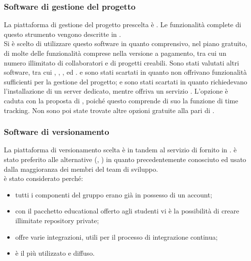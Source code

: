 \subsubsection{Software di gestione del progetto}
La piattaforma di gestione del progetto prescelta è \textbf{}. Le funzionalità complete di questo strumento vengono descritte in .\\
Si è scelto di utilizzare questo software in quanto comprensivo, nel piano gratuito, di molte delle funzionalità comprese nella versione a pagamento, tra cui un numero illimitato di collaboratori e di progetti creabili. Sono stati valutati altri software, tra cui , , ,  ed .  e  sono stati scartati in quanto non offrivano funzionalità sufficienti per la gestione del progetto;  e  sono stati scartati in quanto richiedevano l'installazione di un server dedicato, mentre  offriva un servizio . L'opzione  è caduta con la proposta di , poiché questo comprende di suo la funzione di time tracking. Non sono poi state trovate altre opzioni gratuite alla pari di .

\subsubsection{Software di versionamento}
La piattaforma di versionamento scelta è  in tandem al servizio di  fornito in .  è stato preferito alle alternative (, ) in quanto precedentemente conosciuto ed usato dalla maggioranza dei membri del team di sviluppo.\\
 è stato considerato perché:
\begin{itemize}
	\item tutti i componenti del gruppo erano già in possesso di un account;
	\item con il pacchetto educational offerto agli studenti vi è la possibilità di creare illimitate repository private;
	\item offre varie integrazioni, utili per il processo di integrazione continua;
	\item è il più utilizzato e diffuso.
\end{itemize}

